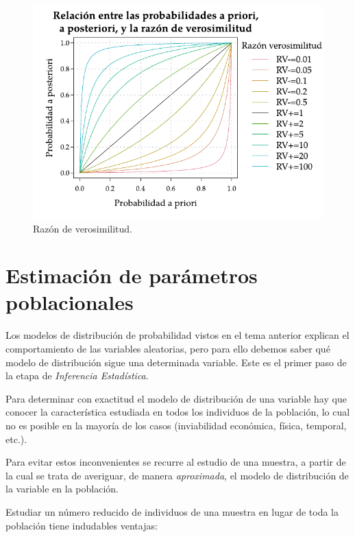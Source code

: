 \documentclass[
  a4paper,
]{scrreport}
\theoremstyle{plain}
\theoremstyle{definition}
\theoremstyle{definition}
\theoremstyle{remark}
\begin{document}
\begin{figure}[H]

{\centering \includegraphics{img/probabilidad/razon_verosimilitud.pdf}

}

\caption{Razón de verosimilitud.}

\end{figure}%


\chapter{Estimación de parámetros
poblacionales}\label{estimaciuxf3n-de-paruxe1metros-poblacionales}

Los modelos de distribución de probabilidad vistos en el tema anterior
explican el comportamiento de las variables aleatorias, pero para ello
debemos saber qué modelo de distribución sigue una determinada variable.
Este es el primer paso de la etapa de \emph{Inferencia Estadística}.

Para determinar con exactitud el modelo de distribución de una variable
hay que conocer la característica estudiada en todos los individuos de
la población, lo cual no es posible en la mayoría de los casos
(inviabilidad económica, física, temporal, etc.).

Para evitar estos inconvenientes se recurre al estudio de una muestra, a
partir de la cual se trata de averiguar, de manera \emph{aproximada}, el
modelo de distribución de la variable en la población.

Estudiar un número reducido de individuos de una muestra en lugar de
toda la población tiene indudables ventajas:
\end{document}
